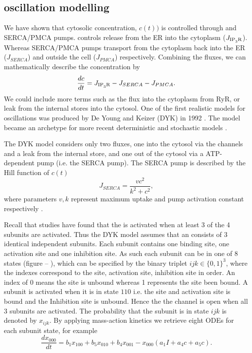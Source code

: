 \documentclass[../main.tex]{subfiles}
\begin{document}
\subsection{ oscillation modelling}
We have shown that cytosolic  concentration, $c(t))$ is controlled through  and SERCA/PMCA pumps.  controls  release from the ER into the cytoplasm ($J_{\ce{IP_3R}}$). Whereas SERCA/PMCA pumps transport  from the cytoplasm back into the ER ($J_{SERCA}$) and outside the cell ($J_{PMCA}$) respectively. Combining the fluxes, we can mathematically describe the  concentration by 
\begin{equation}
\frac{dc}{dt} =  J_{\ce{IP_3R}} - J_{SERCA} - J_{PMCA}.
\end{equation}
We could include more terms such as the flux into the cytoplasm from RyR, or leak from the internal stores into the cytosol. One of the first realistic models for  oscillations was produced by De Young and Keizer (DYK) in 1992 \cite{DeYoung_1992}. The model became an archetype for more recent deterministic \cite{Li_1994, Atri_1993, Tang_1996} and stochastic models \cite{Falcke_2000, Falcke_2003}.

The DYK model considers only two fluxes, one into the cytosol via the  channels and a leak from the internal store, and one out of the cytosol via a ATP-dependent pump (i.e. the SERCA pump). The SERCA pump is described by the Hill function of $c(t)$
\begin{equation}
J_{SERCA} = \frac{vc^2}{k^2 + c^2},
\end{equation}
where parameters $v,k$ represent maximum  uptake and pump activation constant respectively \cite{DeYoung_1992}.

Recall that studies have found that the  is activated when at least 3 of the 4 subunits are activated. Thus the DYK model assumes that an  consists of 3 identical independent subunits. Each subunit contains one  binding site, one  activation site and one  inhibition site. As such each subunit can be in one of 8 states (figure -- ), which can be specified by the binary triplet ${ijk} \in \{0,1 \}^3$, where the indexes correspond to the  site,  activation site,  inhibition site in order. An index of 0 means the site is unbound whereas 1 represents the site been bound. A subunit is activated when it is in state ${110}$ i.e. the  site and  activation site is bound and the  Inhibition site is unbound. Hence the the channel is open when all 3 subunits are activated. The probability that the subunit is in state $ijk$ is denoted by $x_{ijk}$.
By applying mass-action kinetics we retrieve eight ODEs for each subunit state, for example
\begin{equation}
\frac{d x_{000}}{dt} =b_1x_{100} + b_5x_{010} + b_4x_{001} -x_{000}\left(a_1I + a_4c  +a_5c \right). 
\end{equation} 
\end{document}
